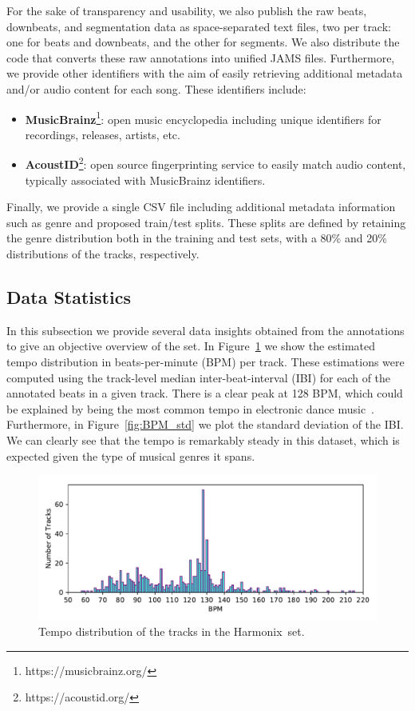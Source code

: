 \documentclass{article}
\newcommand{\setName}{Harmonix}
\begin{document}
For the sake of transparency and usability, we also publish the raw beats, downbeats, and segmentation data as space-separated text files, two per track: one for beats and downbeats, and the other for segments.
We also distribute the code that converts these raw annotations into unified JAMS files.
Furthermore, we provide other identifiers with the aim of easily retrieving additional metadata and/or audio content for each song.
These identifiers include:

\begin{itemize}
    \item \textbf{MusicBrainz}\footnote{https://musicbrainz.org/}: open music encyclopedia including unique identifiers for recordings, releases, artists, etc. 
    \item \textbf{AcoustID}\footnote{https://acoustid.org/}: open source fingerprinting service to easily match audio content, typically associated with MusicBrainz identifiers.
\end{itemize}

Finally, we provide a single CSV file including additional metadata information such as genre and proposed train/test splits.
These splits are defined by retaining the genre distribution both in the training and test sets, with a 80\% and 20\% distributions of the tracks, respectively.

\subsection{Data Statistics}

In this subsection we provide several data insights obtained from the annotations to give an objective overview of the set.
In Figure~\ref{fig:BPM_dist} we show the estimated tempo distribution in beats-per-minute (BPM) per track.
These estimations were computed using the track-level median inter-beat-interval (IBI) for each of the annotated beats in a given track.
There is a clear peak at 128 BPM, which could be explained by being the most common tempo in electronic dance music~\cite{Moelants2008}.
Furthermore, in Figure~\ref{fig:BPM_std} we plot the standard deviation of the IBI.
We can clearly see that the tempo is remarkably steady in this dataset, which is expected given the type of musical genres it spans.

\begin{figure}
    \centerline{\includegraphics[width=1.05\columnwidth]{figs/BPM_distribution.pdf}}
    \caption{Tempo distribution of the tracks in the \setName~set.}
    \label{fig:BPM_dist}
\end{figure}
\end{document}
